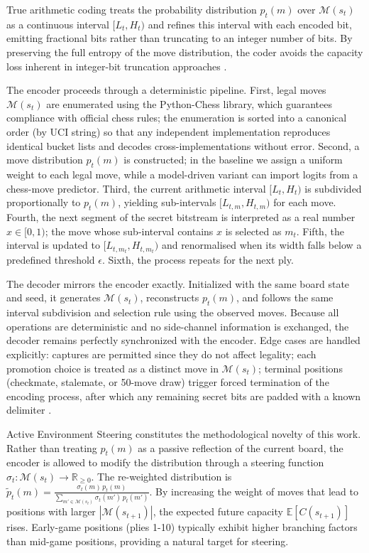 \documentclass[journal]{IEEEtran}
\begin{document}
True arithmetic coding treats the probability distribution $p_t(m)$ over $\mathcal{M}(s_t)$ as a continuous interval $[L_t, H_t)$ and refines this interval with each encoded bit, emitting fractional bits rather than truncating to an integer number of bits. By preserving the full entropy of the move distribution, the coder avoids the capacity loss inherent in integer-bit truncation approaches \cite{shen2020nearimpercepti, nasution2018imagesteganogr, baraskar2018truecolor}.

The encoder proceeds through a deterministic pipeline. First, legal moves $\mathcal{M}(s_t)$ are enumerated using the Python-Chess library, which guarantees compliance with official chess rules; the enumeration is sorted into a canonical order (by UCI string) so that any independent implementation reproduces identical bucket lists and decodes cross-implementations without error. Second, a move distribution $p_t(m)$ is constructed; in the baseline we assign a uniform weight to each legal move, while a model-driven variant can import logits from a chess-move predictor. Third, the current arithmetic interval $[L_t, H_t)$ is subdivided proportionally to $p_t(m)$, yielding sub-intervals $[L_{t,m}, H_{t,m})$ for each move. Fourth, the next segment of the secret bitstream is interpreted as a real number $x \in [0,1)$; the move whose sub-interval contains $x$ is selected as $m_t$. Fifth, the interval is updated to $[L_{t,m_t}, H_{t,m_t})$ and renormalised when its width falls below a predefined threshold $\epsilon$. Sixth, the process repeats for the next ply.

The decoder mirrors the encoder exactly. Initialized with the same board state and seed, it generates $\mathcal{M}(s_t)$, reconstructs $p_t(m)$, and follows the same interval subdivision and selection rule using the observed moves. Because all operations are deterministic and no side-channel information is exchanged, the decoder remains perfectly synchronized with the encoder. Edge cases are handled explicitly: captures are permitted since they do not affect legality; each promotion choice is treated as a distinct move in $\mathcal{M}(s_t)$; terminal positions (checkmate, stalemate, or 50-move draw) trigger forced termination of the encoding process, after which any remaining secret bits are padded with a known delimiter \cite{durge2026crossdataset, walker2026chessworld, diallo2025chessmovellmla}.

Active Environment Steering constitutes the methodological novelty of this work. Rather than treating $p_t(m)$ as a passive reflection of the current board, the encoder is allowed to modify the distribution through a steering function $\sigma_t:\mathcal{M}(s_t)\rightarrow\mathbb{R}_{\ge 0}$. The re-weighted distribution is $\tilde{p}_t(m)=\frac{\sigma_t(m)\,p_t(m)}{\sum_{m'\in\mathcal{M}(s_t)}\sigma_t(m')\,p_t(m')}$. By increasing the weight of moves that lead to positions with larger $|\mathcal{M}(s_{t+1})|$, the expected future capacity $\mathbb{E}[C(s_{t+1})]$ rises. Early-game positions (plies 1-10) typically exhibit higher branching factors than mid-game positions, providing a natural target for steering.
\end{document}
